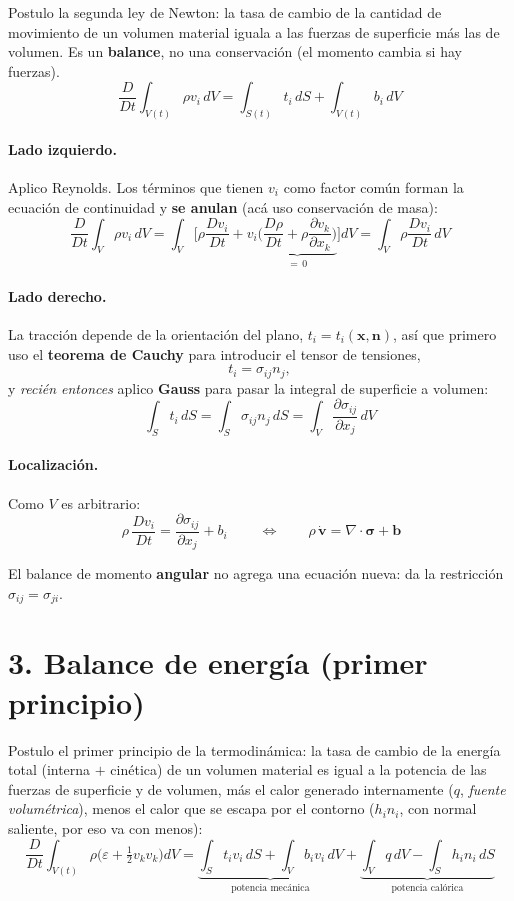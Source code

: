 \documentclass[11pt,a4paper]{article}
\begin{document}
Postulo la segunda ley de Newton: la tasa de cambio de la cantidad de movimiento
de un volumen material iguala a las fuerzas de superficie más las de volumen.
Es un \textbf{balance}, no una conservación (el momento cambia si hay fuerzas).
\[
\frac{D}{Dt}\int_{V(t)}\rho v_i\,dV=\int_{S(t)}t_i\,dS+\int_{V(t)}b_i\,dV
\]

\paragraph{Lado izquierdo.} Aplico Reynolds. Los términos que tienen $v_i$ como
factor común forman la ecuación de continuidad y \textbf{se anulan} (acá uso
conservación de masa):
\[
\frac{D}{Dt}\int_V\rho v_i\,dV
=\int_V\Big[\rho\frac{Dv_i}{Dt}
+v_i\underbrace{\Big(\frac{D\rho}{Dt}+\rho\frac{\partial v_k}{\partial x_k}\Big)}_{=\,0}\Big]dV
=\int_V\rho\frac{Dv_i}{Dt}\,dV
\]

\paragraph{Lado derecho.} La tracción depende de la orientación del plano,
$t_i=t_i(\boldsymbol x,\boldsymbol n)$, así que primero uso el \textbf{teorema de Cauchy}
para introducir el tensor de tensiones,
\[
t_i=\sigma_{ij}n_j ,
\]
y \emph{recién entonces} aplico \textbf{Gauss} para pasar la integral de superficie a volumen:
\[
\int_S t_i\,dS=\int_S\sigma_{ij}n_j\,dS=\int_V\frac{\partial\sigma_{ij}}{\partial x_j}\,dV
\]

\paragraph{Localización.} Como $V$ es arbitrario:
\[
\boxed{\ \rho\,\frac{Dv_i}{Dt}=\frac{\partial\sigma_{ij}}{\partial x_j}+b_i\ }
\qquad\Longleftrightarrow\qquad
\rho\,\dot{\boldsymbol v}=\nabla\cdot\boldsymbol\sigma+\boldsymbol b
\]

\medskip
\noindent El balance de momento \textbf{angular} no agrega una ecuación nueva:
da la restricción $\sigma_{ij}=\sigma_{ji}$.

\section*{3. Balance de energía (primer principio)}

Postulo el primer principio de la termodinámica: la tasa de cambio de la energía
total (interna $+$ cinética) de un volumen material es igual a la potencia de las
fuerzas de superficie y de volumen, más el calor generado internamente
($q$, \emph{fuente volumétrica}), menos el calor que se escapa por el contorno
($h_i n_i$, con normal saliente, por eso va con menos):
\[
\frac{D}{Dt}\int_{V(t)}\rho\Big(\varepsilon+\tfrac12 v_kv_k\Big)dV
=\underbrace{\int_S t_iv_i\,dS+\int_V b_iv_i\,dV}_{\text{potencia mecánica}}
+\underbrace{\int_V q\,dV-\int_S h_in_i\,dS}_{\text{potencia calórica}}
\]
\end{document}
